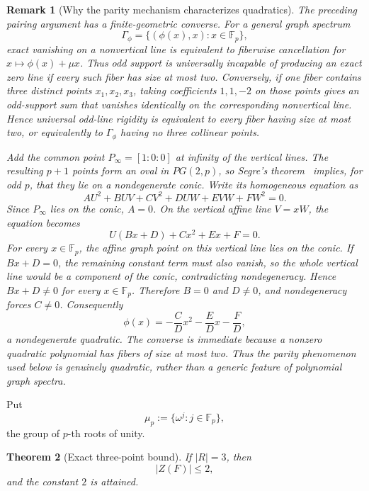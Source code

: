 \documentclass[11pt]{article}
\newtheorem{theorem}{Theorem}[section]
\newtheorem{remark}[theorem]{Remark}
\newcommand{\F}{\mathbb F}
\begin{document}
\begin{remark}[Why the parity mechanism characterizes quadratics]
\label{rem:segre-quadratic-characterization}
The preceding pairing argument has a finite-geometric converse.
For a general graph spectrum
\[
 \Gamma_\phi=\{(\phi(x),x):x\in\F_p\},
\]
exact vanishing on a nonvertical line is equivalent to fiberwise
cancellation for \(x\mapsto\phi(x)+\mu x\).  Thus odd support is
universally incapable of producing an exact zero line if every such
fiber has size at most two.  Conversely, if one fiber contains three
distinct points \(x_1,x_2,x_3\), taking coefficients \(1,1,-2\) on
those points gives an odd-support sum that vanishes identically on the
corresponding nonvertical line.  Hence universal odd-line rigidity is
equivalent to every fiber having size at most two, or equivalently to
\(\Gamma_\phi\) having no three collinear points.

Add the common point \(P_\infty=[1:0:0]\) at infinity of the vertical
lines.  The resulting \(p+1\) points form an oval in \(PG(2,p)\), so
Segre's theorem~\cite{SegreOval} implies, for odd \(p\), that they lie
on a nondegenerate conic.  Write its homogeneous equation as
\[
 AU^2+BUV+CV^2+DUW+EVW+FW^2=0.
\]
Since \(P_\infty\) lies on the conic, \(A=0\).  On the vertical affine
line \(V=xW\), the equation becomes
\[
 U(Bx+D)+Cx^2+Ex+F=0.
\]
For every \(x\in\F_p\), the affine graph point on this vertical
line lies on the conic.  If \(Bx+D=0\), the remaining constant term must
also vanish, so the whole vertical line would be a component of the conic,
contradicting nondegeneracy.  Hence \(Bx+D\ne0\) for every
\(x\in\F_p\).  Therefore \(B=0\) and \(D\ne0\), and nondegeneracy
forces \(C\ne0\).  Consequently
\[
 \phi(x)=-\frac{C}{D}x^2-\frac{E}{D}x-\frac{F}{D},
\]
a nondegenerate quadratic.  The converse is immediate because a
nonzero quadratic polynomial has fibers of size at most two.  Thus the
parity phenomenon used below is genuinely quadratic, rather than a
generic feature of polynomial graph spectra.
\end{remark}

Put
\[
 \mu_p:=\{\omega^j:j\in\F_p\},
\]
the group of \(p\)-th roots of unity.

\begin{theorem}[Exact three-point bound]
\label{thm:three-point-exact}
If $|R|=3$, then
\begin{equation}
 \boxed{|Z(F)|\le2,}
 \label{eq:three-point-bound}
\end{equation}
and the constant $2$ is attained.
\end{theorem}
\end{document}
